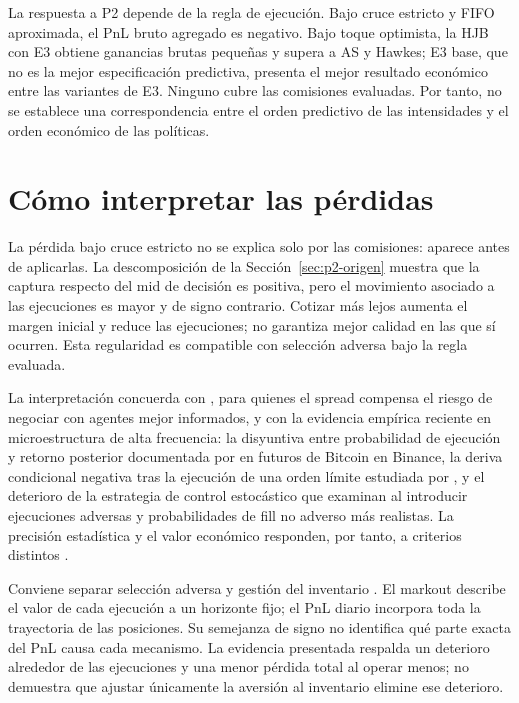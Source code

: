 La respuesta a P2 depende de la regla de ejecución. Bajo cruce estricto y FIFO aproximada, el PnL bruto agregado es negativo. Bajo toque optimista, la HJB con E3 obtiene ganancias brutas pequeñas y supera a AS y Hawkes; E3 base, que no es la mejor especificación predictiva, presenta el mejor resultado económico entre las variantes de E3. Ninguno cubre las comisiones evaluadas. Por tanto, no se establece una correspondencia entre el orden predictivo de las intensidades y el orden económico de las políticas.

\section{Cómo interpretar las pérdidas}

La pérdida bajo cruce estricto no se explica solo por las comisiones: aparece antes de aplicarlas. La descomposición de la Sección~\ref{sec:p2-origen} muestra que la captura respecto del mid de decisión es positiva, pero el movimiento asociado a las ejecuciones es mayor y de signo contrario. Cotizar más lejos aumenta el margen inicial y reduce las ejecuciones; no garantiza mejor calidad en las que sí ocurren. Esta regularidad es compatible con selección adversa bajo la regla evaluada.

La interpretación concuerda con \citet{GlostenMilgrom1985}, para quienes el spread compensa el riesgo de negociar con agentes mejor informados, y con la evidencia empírica reciente en microestructura de alta frecuencia: la disyuntiva entre probabilidad de ejecución y retorno posterior documentada por \citet{AlbersEtAl2025} en futuros de Bitcoin en Binance, la deriva condicional negativa tras la ejecución de una orden límite estudiada por \citet{DeLise2024}, y el deterioro de la estrategia de control estocástico que \citet{LalorSwishchuk2024} examinan al introducir ejecuciones adversas y probabilidades de fill no adverso más realistas. La precisión estadística y el valor económico responden, por tanto, a criterios distintos \citep{LeitchTanner1991}.

Conviene separar selección adversa y gestión del inventario \citep{Menkveld2013}. El markout describe el valor de cada ejecución a un horizonte fijo; el PnL diario incorpora toda la trayectoria de las posiciones. Su semejanza de signo no identifica qué parte exacta del PnL causa cada mecanismo. La evidencia presentada respalda un deterioro alrededor de las ejecuciones y una menor pérdida total al operar menos; no demuestra que ajustar únicamente la aversión al inventario elimine ese deterioro.

